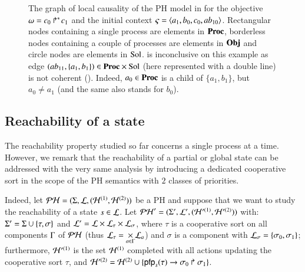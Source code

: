 \begin{example}
\begin{figure}[tp]
  \caption{
  \label{fig:sa-livelock}
    The graph of local causality of the PH model in 
    for the objective $\omega = \mbox{$c_0\Rsh^*\!c_1$}$ and the initial context $\varsigma = \mbox{$\langle a_1, b_0, c_0, ab_{10} \rangle$}$.
    Rectangular nodes containing a single process are elements in $\mathbf{Proc}$,
    borderless nodes containing a couple of processes are elements in $\mathbf{Obj}$
    and circle nodes are elements in $\mathrm{Sol}$.
     is inconclusive on this example as edge $(ab_{11}, \{ a_1, b_1 \}) \in \mathbf{Proc} \times \mathrm{Sol}$ (here represented with a double line) is not coherent ().
    Indeed, $a_0 \in \mathbf{Proc}$ is a child of $\{ a_1, b_1 \}$, but $a_0 \neq a_1$ (and the same also stands for $b_0$).
  }
\end{figure}
\end{example}


\subsection{Reachability of a state}

\newcommand{\total}{\tau}
\newcommand{\reach}{\sigma}

The reachability property studied so far concerns a single process at a time.
However, we remark that the reachability of a partial or global state can be
addressed with the very same analysis by introducing a dedicated cooperative
sort in the scope of the PH semantics with $2$ classes of priorities.

Indeed, let $\mathcal{PH} = (\Sigma, \mathcal{L}, (\mathcal{H}^{(1)}, \mathcal{H}^{(2)}))$ be a PH and suppose that we want to study the reachability of a state $s \in \mathcal{L}$.
Let $\mathcal{PH}' = (\Sigma', \mathcal{L}', (\mathcal{H}'^{(1)}, \mathcal{H}'^{(2)}))$
with: $\PHs' = \PHs \cup \{ \total, \reach \}$ and $\PHl' = \PHl \times \PHl_\total \times \PHl_\reach$,
where $\total$ is a cooperative sort on all components $\Gamma$ of $\mathcal{PH}$ (thus $\PHl_\total = \underset{a \in \components}{\times} \PHl_a$)
and $\reach$ is a component with $\PHl_\reach = \{ \reach_0, \reach_1 \}$;
furthermore, $\mathcal{H}'^{(1)}$ is the set $\mathcal{H}^{(1)}$ completed with all actions updating the cooperative sort $\total$,
and $\PHh'^{(2)} = \PHh^{(2)} \cup \{ \PHhit{\pfp_s(\total)}{\reach_0}{\reach_1} \}$.

